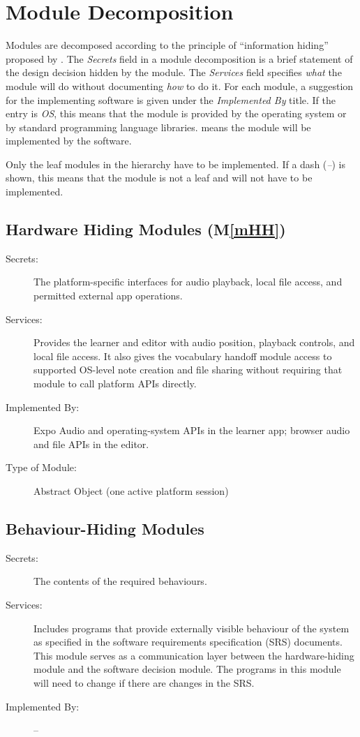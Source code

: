 \documentclass[12pt, titlepage]{article}
\newcommand{\mref}[1]{M\ref{#1}}
\begin{document}
\section{Module Decomposition} \label{SecMD}

Modules are decomposed according to the principle of ``information hiding''
proposed by \citet{ParnasEtAl1984}. The \emph{Secrets} field in a module
decomposition is a brief statement of the design decision hidden by the
module. The \emph{Services} field specifies \emph{what} the module will do
without documenting \emph{how} to do it. For each module, a suggestion for the
implementing software is given under the \emph{Implemented By} title. If the
entry is \emph{OS}, this means that the module is provided by the operating
system or by standard programming language libraries.  \emph{\progname{}} means the
module will be implemented by the \progname{} software.

Only the leaf modules in the hierarchy have to be implemented. If a dash
(\emph{--}) is shown, this means that the module is not a leaf and will not have
to be implemented.

\subsection{Hardware Hiding Modules (\mref{mHH})}

\begin{description}
\item[Secrets:] The platform-specific interfaces for audio playback,
  local file access, and permitted external app operations.
\item[Services:] Provides the learner and editor with audio position,
  playback controls, and local file access. It also gives the vocabulary
  handoff module access to supported OS-level note creation and file
  sharing without requiring that module to call platform APIs directly.
\item[Implemented By:] Expo Audio and operating-system APIs in the learner app;
  browser audio and file APIs in the editor.
\item[Type of Module:] Abstract Object (one active platform session)
\end{description}

\subsection{Behaviour-Hiding Modules}

\begin{description}
\item[Secrets:]The contents of the required behaviours.
\item[Services:]Includes programs that provide externally visible behaviour of
  the system as specified in the software requirements specification (SRS)
  documents. This module serves as a communication layer between the
  hardware-hiding module and the software decision module. The programs in this
  module will need to change if there are changes in the SRS.
\item[Implemented By:] --
\end{description}
\end{document}
